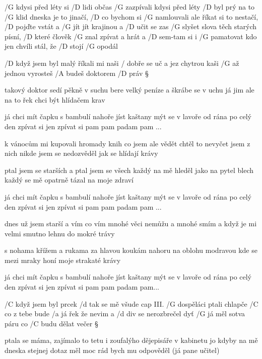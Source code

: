 
/G kdysi před léty si /D lidi občas /G zazpívali
kdysi před léty /D byl prý na to /G klid
dneska je to jinačí, /D co bychom si /G namlouvali
ale říkat si to nestačí, /D pojďte vstát a /G jít
jít krajinou a /D učit se zas /G slyšet slova
těch starých písní, /D které člověk /G znal
zpívat a hrát a /D sem-tam si i /G pamatovat
kdo jen chvíli stál, že /D stojí /G opodál




/D když jsem byl malý říkali mi naši
/ dobře se uč a jez chytrou kaši
/G až jednou vyrosteš /A budeš doktorem /D práv \S

takový doktor sedí pěkně v suchu
bere velký peníze a škrábe se v uchu
já jim ale na to řek chci být hlídačem krav \s

já chci mít čapku s bambulí nahoře
jíst kaštany mýt se v lavoře
od rána po celý den
zpívat si jen
zpívat si pam pam padam pam ... \s

k vánocům mi kupovali hromady knih
co jsem ale vědět chtěl to nevyčet jsem z nich
nikde jsem se nedozvěděl jak se hlídají krávy \s

ptal jsem se starších a ptal jsem se všech
každý na mě hleděl jako na pytel blech
každý se mě opatrně tázal na moje zdraví \s

já chci mít čapku s bambulí nahoře
jíst kaštany mýt se v lavoře
od rána po celý den
zpívat si jen
zpívat si pam pam padam pam ... \s

dnes už jsem starší a vím co vím
mnohé věci nemůžu a mnohé smím
a když je mi velmi smutno lehnu do mokré trávy \s

s nohama křížem a rukama za hlavou
koukám nahoru na oblohu modravou
kde se mezi mraky honí moje strakaté krávy \s

já chci mít čapku s bambulí nahoře
jíst kaštany mýt se v lavoře
od rána po celý den
zpívat si jen
zpívat si pam pam padam pam...




/C když jsem byl prcek /d tak se mě všude \hfill cap III.
/G dospěláci ptali chlapče /C co z tebe bude
/a já řek že nevim a /d div se nerozbrečel
dyť /G já měl sotva páru co /C budu dělat večer \S

ptala se máma, zajímalo to tetu
i zoufalýho dějepisáře v kabinetu
jo kdyby na mě dneska stejnej dotaz měl
moc rád bych mu odpověděl (já pane učitel)

